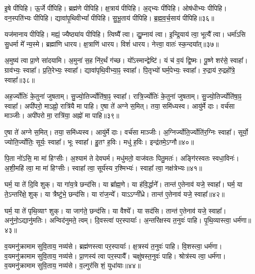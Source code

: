 इ॒षे पी॑पिहि। 
ऊ॒र्जे पी॑पिहि। 
ब्रह्म॑णे पीपिहि। 
क्ष॒त्राय॑ पीपिहि। 
अ॒द्भ्यः पी॑पिहि। 
ओष॑धीभ्यः पीपिहि। 
वन॒स्पति॑भ्यः पीपिहि। 
द्यावा॑पृ॒थिवीभ्यां᳚ पीपिहि। 
सु॒भू॒ताय॑ पीपिहि। 
ब्र॒ह्म॒व॒र्च॒साय॑ पीपिहि॥३६॥

यज॑मानाय पीपिहि। 
मह्यं॒ ज्यैष्ठ्या॑य पीपिहि। 
त्विष्यै᳚ त्वा। 
द्यु॒म्नाय॑ त्वा। 
इ॒न्द्रि॒याय॑ त्वा॒ भूत्यै᳚ त्वा। 
धर्मा॑ऽसि सु॒धर्मा मे᳚ न्य॒स्मे। 
ब्रह्मा॑णि धारय। 
क्ष॒त्राणि॑ धारय। 
विशं॑ धारय। 
नेत्त्वा॒ वातः॑ स्क॒न्दया᳚त्॥३७॥

अ॒मुष्य॑ त्वा प्रा॒णे सा॑दयामि। 
अ॒मुना॑ स॒ह नि॑र॒र्थं ग॑च्छ। 
यो᳚ऽस्मान्द्वेष्टि॑। 
यं च॑ व॒यं द्वि॒ष्मः। 
पू॒ष्णे शर॑से॒ स्वाहा᳚। 
ग्राव॑भ्यः॒ स्वाहा᳚। 
प्र॒ति॒रेभ्यः॒ स्वाहा᳚। 
द्यावा॑पृथि॒वीभ्या॒ꣴ॒ स्वाहा᳚। 
पि॒तृभ्यो॑ घर्म॒पेभ्यः॒ स्वाहा᳚। 
रु॒द्राय॑ रु॒द्रहो᳚त्रे॒ स्वाहा᳚॥३८॥

अह॒र्ज्योतिः॑ के॒तुना॑ जुषताम्। 
सु॒ज्यो॒तिर्ज्योति॑षा॒ꣴ॒ स्वाहा᳚। 
रात्रि॒र्ज्योतिः॑ के॒तुना॑ जुषताम्। 
सु॒ज्यो॒तिर्ज्योति॑षा॒ꣴ॒ स्वाहा᳚। 
अपी॑परो॒ माऽह्नो॒ रात्रि॑यै मा पाहि। 
ए॒षा ते॑ अग्ने स॒मित्। 
तया॒ समि॑ध्यस्व। 
आयु॑र्मे दाः। 
वर्च॑सा माञ्जीः। 
अपी॑परो मा॒ रात्रि॑या॒ अह्नो॑ मा पाहि॥३९॥

ए॒षा ते॑ अग्ने स॒मित्। 
तया॒ समि॑ध्यस्व। 
आयु॑र्मे दाः। 
वर्च॑सा माञ्जीः। 
अ॒ग्निर्ज्योति॒र्ज्योति॑र॒ग्निः स्वाहा᳚। 
सूर्यो॒ ज्योति॒र्ज्योतिः॒ सूर्यः॒ स्वाहा᳚। 
भूः स्वाहा᳚। 
हु॒तꣳ ह॒विः। 
मधु॑ ह॒विः। 
इन्द्र॑तमे॒ऽग्नौ॥४०॥

पि॒ता नो॑ऽसि॒ मा मा॑ हिꣳसीः। 
अ॒श्याम॑ ते देवघर्म। 
मधु॑मतो॒ वाज॑वतः पितु॒मतः॑। 
अङ्गि॑रस्वतः स्वधा॒विनः॑। 
अ॒शी॒महि॑ त्वा॒ मा मा॑ हिꣳसीः। 
स्वाहा᳚ त्वा॒ सूर्य॑स्य र॒श्मिभ्यः॑। 
स्वाहा᳚ त्वा॒ नक्ष॑त्रेभ्यः॥४१॥
\anuvakamend[ब्र॒ह्म॒व॒र्च॒साय॑ पीपिहि स्क॒न्दया᳚द्रु॒द्राय॑ रु॒द्रहो᳚त्रे॒ स्वाहाऽह्नो॑ मा पाह्य॒ग्नौ स॒प्त च॑]

घर्म॒ या ते॑ दि॒वि शुक्। 
या गा॑य॒त्रे छन्द॑सि। 
या ब्रा᳚ह्म॒णे। 
या ह॑वि॒र्द्धाने᳚। 
तान्त॑ ए॒तेनाव॑ यजे॒ स्वाहा᳚। 
घर्म॒ या ते॒ऽन्तरि॑क्षे॒ शुक्। 
या त्रैष्टु॑भे॒ छन्द॑सि। 
या रा॑ज॒न्ये᳚। 
याऽऽग्नी᳚ध्रे। 
तान्त॑ ए॒तेनाव॑ यजे॒ स्वाहा᳚॥४२॥

घर्म॒ या ते॑ पृथि॒व्याꣳ शुक्। 
या जाग॑ते॒ छन्द॑सि। 
या वैश्ये᳚। 
या सद॑सि। 
तान्त॑ ए॒तेनाव॑ यजे॒ स्वाहा᳚। 
अनु॑नो॒ऽद्यानु॑मतिः। 
अन्विद॑नुमते॒ त्वम्। 
दि॒वस्त्वा॑ पर॒स्पायाः᳚। 
अ॒न्तरि॑क्षस्य त॒नुवः॑ पाहि। 
पृ॒थि॒व्यास्त्वा॒ धर्म॑णा॥४३॥

व॒यमनु॑क्रामाम सुवि॒ताय॒ नव्य॑से। 
ब्रह्म॑णस्त्वा पर॒स्पायाः᳚। 
क्ष॒त्रस्य॑ त॒नुवः॑ पाहि। 
वि॒शस्त्वा॒ धर्म॑णा। 
व॒यमनु॑क्रामाम सुवि॒ताय॒ नव्य॑से। 
प्रा॒णस्य॑ त्वा पर॒स्पायै᳚। 
चक्षु॑षस्त॒नुवः॑ पाहि। 
श्रोत्र॑स्य त्वा॒ धर्म॑णा। 
व॒यमनु॑क्रामाम सुवि॒ताय॒ नव्य॑से। 
व॒ल्गुर॑सि शं॒ युधा॑याः॥४४॥

